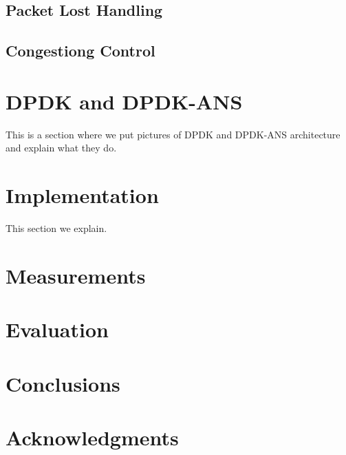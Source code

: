 \documentclass{sig-alternate-05-2015}
\begin{document}
\subsection{Packet Lost Handling}

\subsection{Congestiong Control}

\section{DPDK and DPDK-ANS}
This is a section where we put pictures of DPDK and DPDK-ANS architecture and explain what they do.

\section{Implementation}
This section we explain. 

\section{Measurements}

\section{Evaluation}

\section{Conclusions}

\section{Acknowledgments}



%
%
\end{document}
